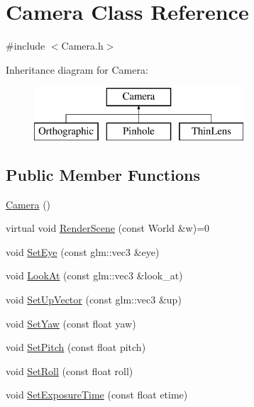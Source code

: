 \hypertarget{class_camera}{}\section{Camera Class Reference}
\label{class_camera}


{\ttfamily \#include $<$Camera.\+h$>$}

Inheritance diagram for Camera\+:\begin{figure}[H]
\begin{center}
\leavevmode
\includegraphics[height=2.000000cm]{class_camera}
\end{center}
\end{figure}
\subsection*{Public Member Functions}
\begin{DoxyCompactItemize}
\item 
\hyperlink{class_camera_a01f94c3543f56ede7af49dc778f19331}{Camera} ()
\item 
virtual void \hyperlink{class_camera_ad65367e9b225387219d013ffed3f621a}{Render\+Scene} (const World \&w)=0
\item 
void \hyperlink{group___cameras_gad2265245e85699e077dc1d8d33eecece}{Set\+Eye} (const glm\+::vec3 \&eye)
\item 
void \hyperlink{group___cameras_ga92295d79a45f2ab1756221836567997a}{Look\+At} (const glm\+::vec3 \&look\+\_\+at)
\item 
void \hyperlink{group___cameras_gaa6c9c847b6db5c4d6450fb9b75f26e81}{Set\+Up\+Vector} (const glm\+::vec3 \&up)
\item 
void \hyperlink{group___cameras_ga0e499019f7cd3029602461fcd63aa40c}{Set\+Yaw} (const float yaw)
\item 
void \hyperlink{group___cameras_ga33e125b9d164e7332dba4cc01c468d6c}{Set\+Pitch} (const float pitch)
\item 
void \hyperlink{group___cameras_ga2c07ac7e812f4dab134fc06692fcaf11}{Set\+Roll} (const float roll)
\item 
void \hyperlink{group___cameras_gaf9985918fc0135ac8c98344c96129509}{Set\+Exposure\+Time} (const float etime)
\end{DoxyCompactItemize}
